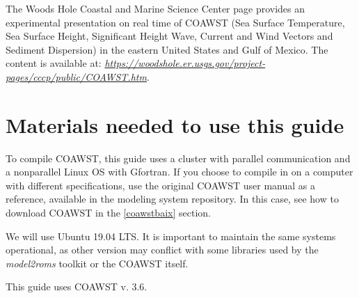 \noindent The Woods Hole Coastal and Marine Science Center page provides an experimental presentation on real time of COAWST (Sea Surface Temperature, Sea Surface Height, Significant Height
Wave, Current and Wind Vectors and Sediment Dispersion) in the eastern United States and Gulf of Mexico. The content is available at: 
\textcolor{bleu_cite}{\href{https://woodshole.er.usgs.gov/project-pages/cccp/public/COAWST.htm}{\textit{https://woodshole.er.usgs.gov/project-pages/cccp/public/COAWST.htm}}}.
\bigskip

\section{Materials needed to use this guide}
\bigskip

\noindent To compile COAWST, this guide uses a cluster with parallel communication and a nonparallel Linux OS with Gfortran. If you choose to compile in
on a computer with different specifications, use the original COAWST user manual as a reference, available in the modeling system repository. In this case,
see how to download COAWST in the \textcolor{bleu_cite}{\ref{coawstbaix}} section.
\bigskip

\noindent We will use Ubuntu 19.04 LTS. It is important to maintain the same systems operational, as other version may conflict with some libraries used by the \textit{model2roms} toolkit or 
the COAWST itself.
\bigskip

\begin{tcolorbox}[enhanced,
    grow to left by=0cm,%
    grow to right by=0cm,%
    enlarge top by=0cm,%
    enlarge bottom by=0cm,%
    tcbox raise base,
    boxrule=1.0pt,
    left=18mm,
    colframe=red!50!black,coltext=red!25!black,colback=red!10!white,
    overlay={\begin{tcbclipinterior}\fill[red!75!blue!50!white] (frame.south west)
      rectangle node[text=white,font=\sffamily\bfseries\footnotesize,rotate=0] {WARNING} ([xshift=18mm]frame.north west);\end{tcbclipinterior}}]
      This guide uses COAWST v. 3.6.
  \end{tcolorbox}
  \bigskip